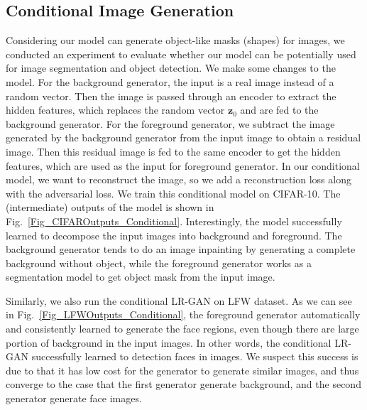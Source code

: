 \documentclass{article} \usepackage{iclr2017_conference,times}
\begin{document}
\subsection{Conditional Image Generation}
Considering our model can generate object-like masks (shapes) for images, we conducted an experiment to evaluate whether our model can be potentially used for image segmentation and object detection. We make some changes to the model. For the background generator, the input is a real image instead of a random vector. Then the image is passed through an encoder to extract the hidden features, which replaces the random vector $\bm{z}_0$ and are fed to the background generator. For the foreground generator, we subtract the image generated by the background generator from the input image to obtain a residual image. Then this residual image is fed to the same encoder to get the hidden features, which are used as the input for foreground generator. In our conditional model, we want to reconstruct the image, so we add a reconstruction loss along with the adversarial loss. We train this conditional model on CIFAR-10. The (intermediate) outputs of the model is shown in Fig.~\ref{Fig_CIFAROutputs_Conditional}. Interestingly, the model successfully learned to decompose the input images into background and foreground. The background generator tends to do an image inpainting by generating a complete background without object, while the foreground generator works as a segmentation model to get object mask from the input image.

Similarly, we also run the conditional LR-GAN on LFW dataset. As we can see in Fig.~\ref{Fig_LFWOutputs_Conditional}, the foreground generator automatically and consistently learned to generate the face regions, even though there are large portion of background in the input images. In other words, the conditional LR-GAN successfully learned to detection faces in images. We suspect this success is due to that it has low cost for the generator to generate similar images, and thus converge to the case that the first generator generate background, and the second generator generate face images.
\end{document}

